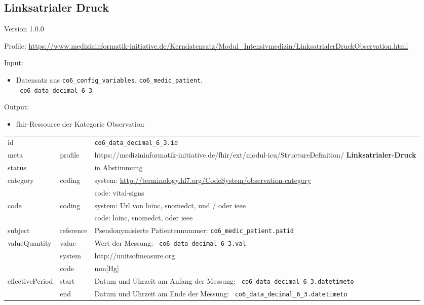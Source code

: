 \subsection{
Linksatrialer Druck} 
\noindent Version 1.0.0

\noindent Profile: \url{https://www.medizininformatik-initiative.de/Kerndatensatz/Modul_Intensivmedizin/LinksatrialerDruckObservation.html}

\noindent Input:
\begin{itemize}
	\item Datensatz aus \texttt{co6\_config\_variables}, \texttt{co6\_medic\_patient}, \\ \texttt{
co6\_data\_decimal\_6\_3}
\end{itemize}
Output:
\begin{itemize}
        \item \ac{fhir}-Ressource der Kategorie \glqq Observation\grqq{}
\end{itemize}
\begin{longtable}{|l|l|p{7.5cm}|}
        \hline
        \rowcolor{lightgray} \multicolumn{3}{|l|}{Data Mapping (inhaltlich)} \\ \hline
        id &  & \texttt{co6\_data\_decimal\_6\_3.id} \\ \hline
	meta & profile & https://medizininformatik-initiative.de/fhir/ext/modul-icu/StructureDefinition/\textbf{
Linksatrialer-Druck} \\ \hline 
	status &  & in Abstimmung  \\ \hline 
	category & coding & system: \url{http://terminology.hl7.org/CodeSystem/observation-category} \\
\cline{3-3}
	& & code: vital-signs \\ \hline
	code & coding & system: Url von \ac{loinc}, \ac{snomedct}, und / oder \ac{ieee} \\ 
	\cline{3-3} 
	 &  & code: \ac{loinc}, \ac{snomedct}, oder \ac{ieee} \\ \hline
	subject & reference & Pseudonymisierte Patientennummer: \texttt{co6\_medic\_patient.patid} \\ \hline
	valueQuantity & value & Wert der Messung: \texttt{
co6\_data\_decimal\_6\_3.val} \\
        \cline{2-3}
         & system & http://unitsofmeasure.org \\
         \cline{2-3}
         & code & mm[Hg] \\ \hline
    effectivePeriod & start & Datum und Uhrzeit am Anfang der Messung: \texttt{
co6\_data\_decimal\_6\_3.datetimeto} \\
    \cline{2-3}
     & end & Datum und Uhrzeit am Ende der Messung: \texttt{
co6\_data\_decimal\_6\_3.datetimeto} \\ \hline
\end{longtable}



